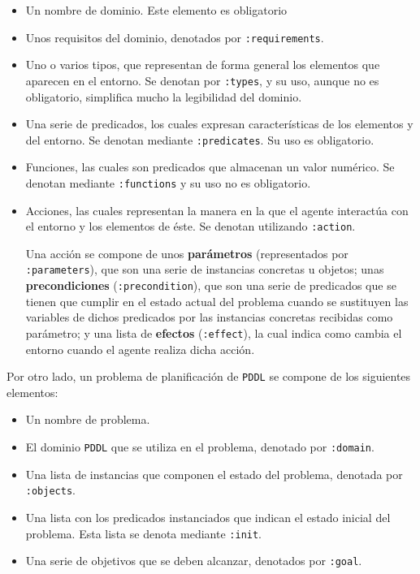\begin{itemize}[label=\textbullet]
    \item Un nombre de dominio. Este elemento es obligatorio
    \item Unos requisitos del dominio, denotados por \texttt{:requirements}.
    \item Uno o varios tipos, que representan de forma general los elementos que aparecen
    en el entorno. Se denotan por \texttt{:types}, y su uso, aunque no es obligatorio, simplifica
    mucho la legibilidad del dominio.
    \item Una serie de predicados, los cuales expresan características de los elementos
    y del entorno. Se denotan mediante \texttt{:predicates}. Su uso es obligatorio.
    \item Funciones, las cuales son predicados que almacenan un valor numérico. Se denotan
    mediante \texttt{:functions} y su uso no es obligatorio.
    \item Acciones, las cuales representan la manera en la que el agente interactúa con
    el entorno y los elementos de éste. Se denotan utilizando \texttt{:action}.
    
    Una acción se compone de unos \textbf{parámetros} (representados por \texttt{:parameters}), que son
    una serie de instancias concretas u objetos; unas \textbf{precondiciones} (\texttt{:precondition}),
    que son una serie de predicados que se tienen que cumplir en el estado actual del problema cuando
    se sustituyen las variables de dichos predicados por las instancias concretas recibidas como parámetro;
    y una lista de \textbf{efectos} (\texttt{:effect}), la cual indica como cambia el entorno cuando
    el agente realiza dicha acción.
\end{itemize}

Por otro lado, un problema de planificación de \texttt{PDDL} se compone de los siguientes elementos:

\begin{itemize}[label=\textbullet]
    \item Un nombre de problema.
    \item El dominio \texttt{PDDL} que se utiliza en el problema, denotado por \texttt{:domain}.
    \item Una lista de instancias que componen el estado del problema, denotada por \texttt{:objects}.
    \item Una lista con los predicados instanciados que indican el estado inicial
    del problema. Esta lista se denota mediante \texttt{:init}.
    \item Una serie de objetivos que se deben alcanzar, denotados por \texttt{:goal}.
\end{itemize}

